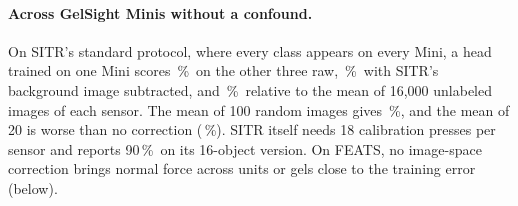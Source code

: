 \documentclass[10pt,twocolumn,letterpaper]{article}
\newcommand{\pct}{\,\%}
\begin{document}
\paragraph{Across GelSight Minis without a confound.}
On SITR's standard protocol, where every class appears on every Mini, a head trained on one Mini scores \SitrDinovRawIntra\pct\ on the other three raw, \SitrDinovBgIntra\pct\ with SITR's background image subtracted, and \SitrDinovStreamIntra\pct\ relative to the mean of 16{,}000 unlabeled images of each sensor. The mean of 100 random images gives \SitrDinovStreamHundredIntra\pct, and the mean of 20 is worse than no correction (\SitrDinovStreamTwentyIntra\pct). SITR itself needs 18 calibration presses per sensor and reports 90\pct\ on its 16-object version. On FEATS, no image-space correction brings normal force across units or gels close to the training error (below).
\end{document}
